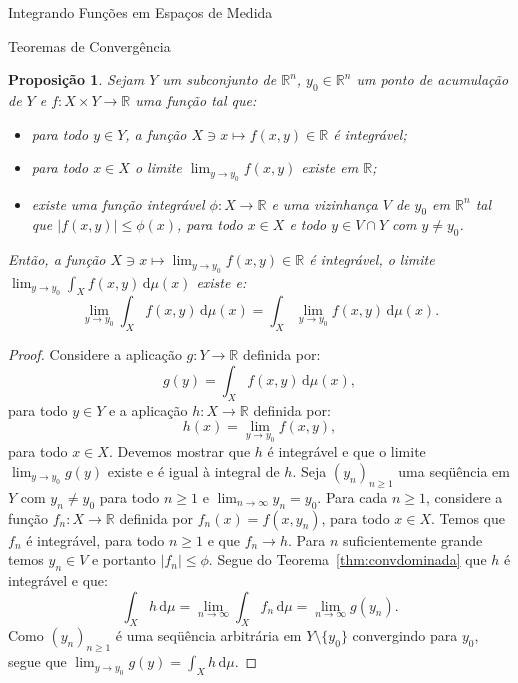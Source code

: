 \documentclass[oneside,final,11pt]{amsbook}
\newcommand{\R}{\mathds R}
\newcommand{\dd}{\mathrm d}
\theoremstyle{remark}\newtheorem{exercise}{Exercício}[chapter]
\theoremstyle{remark}\newtheorem{*exercise}[exercise]{\hbox to 0pt{\hskip 0pt minus 1fil*}Exercício}
\theoremstyle{definition}\newtheorem{exdefin}{Definição}[chapter]
\theoremstyle{plain}\newtheorem{teo}{Teorema}[section]
\theoremstyle{plain}\newtheorem{lem}[teo]{Lema}
\theoremstyle{plain}\newtheorem{prop}[teo]{Proposição}
\theoremstyle{plain}\newtheorem{cor}[teo]{Corolário}
\theoremstyle{definition}\newtheorem{defin}[teo]{Definição}
\theoremstyle{remark}\newtheorem{rem}[teo]{Observação}
\theoremstyle{definition}\newtheorem{notation}[teo]{Notação}
\theoremstyle{definition}\newtheorem{convention}[teo]{Convenção}
\theoremstyle{definition}\newtheorem{example}[teo]{Exemplo}
\numberwithin{section}{chapter}
\numberwithin{equation}{section}
\begin{document}
\begin{chapter}{Integrando Funções em Espaços de Medida}
\begin{section}{Teoremas de Convergência}
\begin{prop}\label{thm:proplimiteintegral}
Sejam $Y$ um subconjunto de $\R^n$, $y_0\in\R^n$ um ponto de acumulação de $Y$ e
$f:X\times Y\to\R$ uma função tal que:
\begin{itemize}
\item para todo $y\in Y$, a função $X\ni x\mapsto f(x,y)\in\R$ é integrável;
\item para todo $x\in X$ o limite $\lim_{y\to y_0}f(x,y)$ existe em $\R$;
\item existe uma função integrável $\phi:X\to\R$ e uma vizinhança $V$ de $y_0$ em $\R^n$
tal que $\vert f(x,y)\vert\le\phi(x)$, para todo $x\in X$ e todo $y\in V\cap Y$ com $y\ne y_0$.
\end{itemize}
Então, a função $X\ni x\mapsto\lim_{y\to y_0}f(x,y)\in\R$ é integrável, o limite
$\lim_{y\to y_0}\int_Xf(x,y)\,\dd\mu(x)$ existe e:
\[\lim_{y\to y_0}\int_Xf(x,y)\,\dd\mu(x)=\int_X\lim_{y\to y_0}f(x,y)\,\dd\mu(x).\]
\end{prop}
\begin{proof}
Considere a aplicação $g:Y\to\R$ definida por:
\[g(y)=\int_Xf(x,y)\,\dd\mu(x),\]
para todo $y\in Y$ e a aplicação $h:X\to\R$ definida por:
\[h(x)=\lim_{y\to y_0}f(x,y),\]
para todo $x\in X$. Devemos mostrar que $h$ é integrável e que o limite $\lim_{y\to y_0}g(y)$
existe e é igual à integral de $h$. Seja $(y_n)_{n\ge1}$ uma seqüência em $Y$ com $y_n\ne y_0$
para todo $n\ge1$ e $\lim_{n\to\infty}y_n=y_0$.
Para cada $n\ge1$, considere a função $f_n:X\to\R$ definida por $f_n(x)=f(x,y_n)$, para todo $x\in X$.
Temos que $f_n$ é integrável, para todo $n\ge1$ e que $f_n\to h$. Para $n$ suficientemente
grande temos $y_n\in V$ e portanto $\vert f_n\vert\le\phi$. Segue do Teorema~\ref{thm:convdominada}
que $h$ é integrável e que:
\[\int_Xh\,\dd\mu=\lim_{n\to\infty}\int_Xf_n\,\dd\mu=\lim_{n\to\infty}g(y_n).\]
Como $(y_n)_{n\ge1}$ é uma seqüência arbitrária em $Y\setminus\{y_0\}$ convergindo
para $y_0$, segue que $\lim_{y\to y_0}g(y)=\int_Xh\,\dd\mu$.
\end{proof}


\end{section}
\end{chapter}
\end{document}
